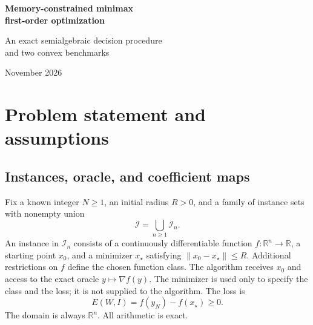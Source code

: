 \documentclass[11pt]{article}
\numberwithin{equation}{section}
\theoremstyle{definition}
\newcommand{\R}{\mathbb R}
\begin{document}
\begin{center}
{\LARGE\bfseries Memory-constrained minimax\\[3pt] first-order optimization\par}
\vspace{0.65em}
{\large An exact semialgebraic decision procedure\\
and two convex benchmarks\par}
\vspace{0.7em}
November 2026
\end{center}
\thispagestyle{plain}
\begin{abstract}
We consider deterministic first-order methods with predetermined scalar coefficients, a prescribed finite number of exact gradient queries, and a bounded number of persistent vector registers. We prove an exact characterization of memory by ranks of past-to-future coefficient blocks. Under an effective finite semialgebraic description of attainable losses, we prove that projecting the performance condition, imposing the memory equations, and deciding their intersection computes the minimax values and all strict memory gains. Every finite value is a computable real algebraic number. We extend the rank formula and decision procedure to subgradient methods with a projection after every increment, under an explicitly specified register model. For convex quadratics, we calculate the exact value and show that one vector register suffices for every horizon. For convex smooth functions, we give the finite interpolation formula, recover the optimal two-register guarantee, and determine the strict first-register separation using a cited uniqueness theorem and a compactness argument.
\end{abstract}

\section{Problem statement and assumptions}
\label{sec:problem}
\subsection{Instances, oracle, and coefficient maps}
Fix a known integer $N\ge1$, an initial radius $R>0$, and a family of instance sets with nonempty union
\[
 \mathscr I=\bigcup_{n\ge1}\mathscr I_n.
\]
An instance in $\mathscr I_n$ consists of a continuously differentiable function $f:\R^n\to\R$, a starting point $x_0$, and a minimizer $x_\star$ satisfying $\|x_0-x_\star\|\le R$. Additional restrictions on $f$ define the chosen function class. The algorithm receives $x_0$ and access to the exact oracle $y\mapsto\nabla f(y)$. The minimizer is used only to specify the class and the loss; it is not supplied to the algorithm. The loss is
\[
 E(W,I)=f(y_N)-f(x_\star)\ge0.
\]
The domain is always $\R^n$. All arithmetic is exact.
\end{document}
